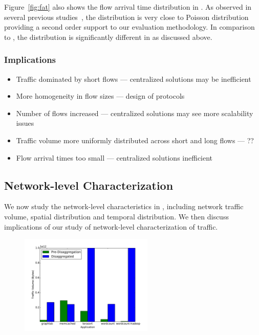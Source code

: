 Figure~\ref{fig:fat} also shows the flow arrival time distribution in \pdis. As observed in several previous studies~\cite{imc-srikanth, imc-theo}, the distribution is very close to Poisson distribution providing a second order support to our evaluation methodology. In comparison to \pdis, the distribution is significantly different in \dis as discussed above.

\subsubsection{Implications}
\begin{itemize}[leftmargin=*]
	\itemsep0em
	\item Traffic dominated by short flows --- centralized solutions may be inefficient
	\item More homogeneity in flow sizes --- design of protocols
	\item Number of flows increased --- centralized solutions may see more scalability issues
	\item Traffic volume more uniformly distributed across short and long flows --- ??
	\item Flow arrival times too small --- centralized solutions inefficient
\end{itemize}

\subsection{Network-level Characterization} 
\label{ssec:nlc}
We now study the network-level characteristics in \dis, including network traffic volume, spatial distribution and temporal distribution. We then discuss implications of our study of network-level characterization of \dis traffic.

%
\begin{figure}
  \centering
    \includegraphics[width = 2.5in]{img/graph5_trafficvolume} 
  \caption{\small{}}
  \label{fig:vol}
\end{figure}
%
